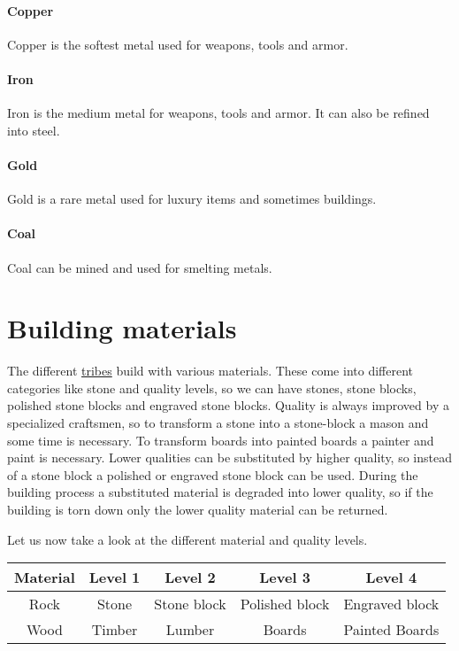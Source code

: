\paragraph{Copper}
Copper is the softest metal used for weapons, tools and armor.

\paragraph{Iron}
Iron is the medium metal for weapons, tools and armor. It can also be refined
into steel.

\paragraph{Gold}
Gold is a rare metal used for luxury items and sometimes buildings.

\paragraph{Coal}
Coal can be mined and used for smelting metals.

\section{Building materials}\label{ch:Goods:Materials}
The different \hyperref[ch:Tribes]{tribes} build with various materials. These
come into different categories like stone and quality levels, so we can have
stones, stone blocks, polished stone blocks and engraved stone blocks. Quality
is always improved by a specialized craftsmen, so to transform a stone into a
stone-block a mason and some time is necessary. To transform boards into
painted boards a painter and paint is necessary. Lower qualities can be
substituted by higher quality, so instead of a stone block a polished or
engraved stone block can be used. During the building process a substituted
material is degraded into lower quality, so if the building is torn down only
the lower quality material can be returned.

Let us now take a look at the different material and quality levels.
\begin{longtable}{ccccc}
	\toprule
	Material & Level 1      & Level 2     & Level 3        & Level 4        \\
	\midrule
	Rock     & Stone        & Stone block & Polished block & Engraved block \\
	Wood     & \Gls{Timber} & Lumber      & Boards         & Painted Boards \\
	\bottomrule
\end{longtable}

